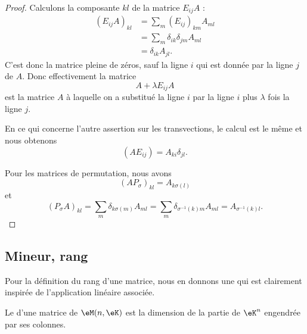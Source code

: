 \begin{proof}
    Calculons la composante \( kl\) de la matrice \( E_{ij}A\) :
    \begin{subequations}
        \begin{align}
            (E_{ij}A)_{kl}&=\sum_m(E_{ij})_{km}A_{ml}\\
            &=\sum_m\delta_{ik}\delta_{jm}A_{ml}\\
            &=\delta_{ik}A_{jl}.
        \end{align}
    \end{subequations}
    C'est donc la matrice pleine de zéros, sauf la ligne \( i\) qui est donnée par la ligne \( j\) de \( A\). Donc effectivement la matrice
    \begin{equation}
        A+\lambda E_{ij}A
    \end{equation}
    est la matrice \( A\) à laquelle on a substitué la ligne \( i\) par la ligne \( i\) plus \( \lambda\) fois la ligne \( j\).

    En ce qui concerne l'autre assertion sur les transvections, le calcul est le même et nous obtenons
    \begin{equation}
        (AE_{ij})=A_{ki}\delta_{jl}.
    \end{equation}

    Pour les matrices de permutation, nous avons
    \begin{equation}
        (AP_{\sigma})_{kl}=A_{k\sigma(l)}
    \end{equation}
    et
    \begin{equation}
        (P_{\sigma}A)_{kl}=\sum_m\delta_{k\sigma(m)}A_{ml}=\sum_m\delta_{\sigma^{-1}(k)m}A_{ml}=A_{\sigma^{-1}(k)l}.
    \end{equation}
\end{proof}

\subsection{Mineur, rang}

Pour la définition du rang d'une matrice, nous en donnons une qui est clairement inspirée de l'application linéaire associée.
\begin{definition}       \label{DEFooCSGXooFRzLRj}
    Le  d'une matrice de \( \eM(n,\eK)\) est la dimension de la partie de \( \eK^n\) engendrée par ses colonnes.
\end{definition}

